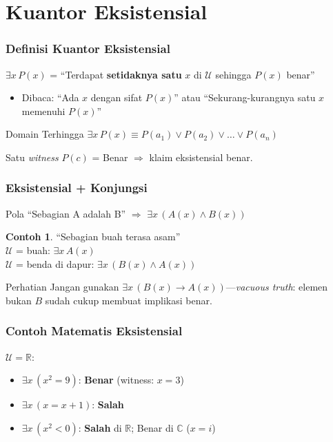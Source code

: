 \documentclass[handout]{beamer}
\theoremstyle{definition}
\theoremstyle{example}
\newtheorem{contoh}[theorem]{Contoh}
\begin{document}
\section{Kuantor Eksistensial}

\begin{frame}
\frametitle{Definisi Kuantor Eksistensial}
$\exists x \, P(x)$ = ``Terdapat \textbf{setidaknya satu} $x$ di $\mathcal{U}$ sehingga $P(x)$ benar''
\begin{itemize}
  \item Dibaca: ``Ada $x$ dengan sifat $P(x)$'' atau ``Sekurang-kurangnya satu $x$ memenuhi $P(x)$''
\end{itemize}
\begin{block}{Domain Terhingga}
$\exists x \, P(x) \equiv P(a_1) \lor P(a_2) \lor \ldots \lor P(a_n)$
\end{block}
Satu \textit{witness} $P(c)$ = Benar $\Rightarrow$ klaim eksistensial benar.
\end{frame}

\begin{frame}
\frametitle{Eksistensial + Konjungsi}
Pola ``Sebagian A adalah B'' $\Rightarrow$ $\exists x \, (A(x) \land B(x))$
\begin{contoh}
``Sebagian buah terasa asam''\\
$\mathcal{U}$ = buah: $\exists x \, A(x)$\\
$\mathcal{U}$ = benda di dapur: $\exists x \, (B(x) \land A(x))$
\end{contoh}
\begin{alertblock}{Perhatian}
Jangan gunakan $\exists x \, (B(x) \rightarrow A(x))$---\textit{vacuous truth}: elemen bukan $B$ sudah cukup membuat implikasi benar.
\end{alertblock}
\end{frame}

\begin{frame}
\frametitle{Contoh Matematis Eksistensial}
$\mathcal{U} = \mathbb{R}$:
\begin{itemize}
  \item $\exists x \, (x^2 = 9)$: \textbf{Benar} (witness: $x=3$)
  \item $\exists x \, (x = x + 1)$: \textbf{Salah}
  \item $\exists x \, (x^2 < 0)$: \textbf{Salah} di $\mathbb{R}$; Benar di $\mathbb{C}$ ($x=i$)
\end{itemize}
\end{frame}
\end{document}
